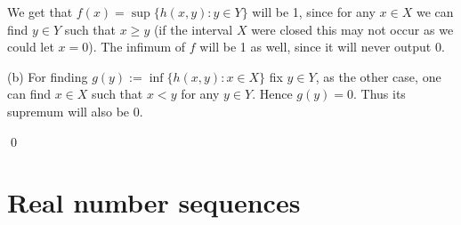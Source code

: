 \documentclass{article}
\theoremstyle{remark}
\begin{document}
\begin{enumerate}
            We get that $f(x) = \sup\{h(x,y): y \in Y\}$ will be 1, since for any $x\in X$ we can find $y \in Y$ such that $x \geq y$ (if the interval $X$ were closed this may not occur as we could let $x = 0$).
            The infimum of $f$ will be 1 as well, since it will never output $0$.

            (b) For finding $g(y) := \inf \{h(x,y) : x \in X\}$ fix $y \in Y$, as the other case, one can find $x \in X$ such that $x < y$ for any $y \in Y$.
            Hence $g(y) = 0$. Thus its supremum will also be 0.
            \begin{flushright}
                \qed
            \end{flushright}
        \end{enumerate}
    \section{Real number sequences}
\end{document}
